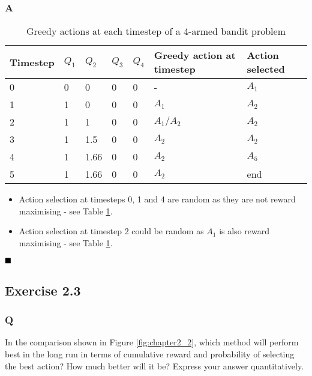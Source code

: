 \subsubsection*{A}
\begin{table}[h!]
	\begin{tabular}{lllllll}
		\hline
		Timestep & \(Q_1\) & \(Q_2\) & \(Q_3\) & \(Q_4\) & Greedy action at timestep & Action selected \\  \hline
		0        & 0    & 0    & 0    & 0    & -                         & \(A_1\)     \\        \hline
		1        & 1    & 0    & 0    & 0    & \(A_1\)                      & \(A_2\)      \\       \hline
		2        & 1    & 1    & 0    & 0    & \(A_1/A_2\)                 & \(A_2\)      \\       \hline
		3        & 1    & 1.5  & 0    & 0    & \(A_2\)                      & \(A_2\)     \\        \hline
		4        & 1    & 1.66 & 0    & 0    & \(A_2\)                      & \(A_5\)    \\         \hline
		5        & 1    & 1.66 & 0    & 0    & \(A_2\)                      & end       \\       \hline
	\end{tabular}
	\label{table: ex2.2}
	\caption{Greedy actions at each timestep of a 4-armed bandit problem}
\end{table}
\begin{itemize}
	\item Action selection at timesteps 0, 1 and 4 are random as they are not reward maximising - see Table \ref{table: ex2.2}.
	\item Action selection at timestep 2 could be random as \(A_1\) is also reward maximising - see Table \ref{table: ex2.2}.
\end{itemize}
$
\hfill \blacksquare
$

\subsection{Exercise 2.3}
\subsubsection*{Q}
In the comparison shown in Figure \ref{fig:chapter2_2}, which method will perform best in the long run in terms of cumulative reward and probability of selecting the best action? How much better will it be? Express your answer quantitatively.

